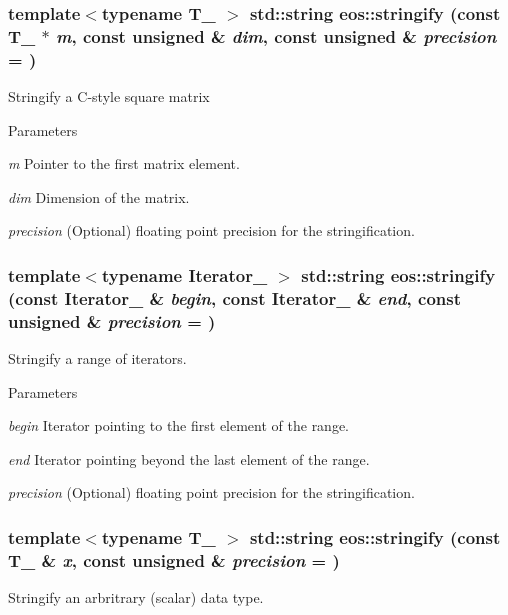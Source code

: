 \hypertarget{namespaceeos_a03d43be369d3c0247d25fedbb6eeb8e9}{
\subsubsection[{stringify}]{\setlength{\rightskip}{0pt plus 5cm}template$<$typename T\_\- $>$ std::string eos::stringify (const T\_\- $\ast$ {\em m}, \/  const unsigned \& {\em dim}, \/  const unsigned \& {\em precision} = {})}}
\label{namespaceeos_a03d43be369d3c0247d25fedbb6eeb8e9}
Stringify a C-\/style square matrix


\begin{DoxyParams}{Parameters}
\item[{\em m}]Pointer to the first matrix element. \item[{\em dim}]Dimension of the matrix. \item[{\em precision}](Optional) floating point precision for the stringification. \end{DoxyParams}
\hypertarget{namespaceeos_ab40b1d4ac1085fb65c4ca86d05079c5c}{
\subsubsection[{stringify}]{\setlength{\rightskip}{0pt plus 5cm}template$<$typename Iterator\_\- $>$ std::string eos::stringify (const Iterator\_\- \& {\em begin}, \/  const Iterator\_\- \& {\em end}, \/  const unsigned \& {\em precision} = {})}}
\label{namespaceeos_ab40b1d4ac1085fb65c4ca86d05079c5c}
Stringify a range of iterators.


\begin{DoxyParams}{Parameters}
\item[{\em begin}]Iterator pointing to the first element of the range. \item[{\em end}]Iterator pointing beyond the last element of the range. \item[{\em precision}](Optional) floating point precision for the stringification. \end{DoxyParams}
\hypertarget{namespaceeos_a4d4fd832aebc28739c76d8cbd3dda6df}{
\subsubsection[{stringify}]{\setlength{\rightskip}{0pt plus 5cm}template$<$typename T\_\- $>$ std::string eos::stringify (const T\_\- \& {\em x}, \/  const unsigned \& {\em precision} = {})}}
\label{namespaceeos_a4d4fd832aebc28739c76d8cbd3dda6df}
Stringify an arbritrary (scalar) data type.


